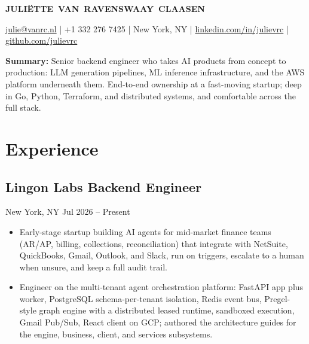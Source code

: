 \documentclass[9pt,letterpaper]{article}
\begin{document}
\begin{center}
    {\Large\bfseries JULIËTTE~VAN~RAVENSWAAY~CLAASEN}
\end{center}
\vspace{2pt}
\begin{center}
\href{mailto:julie@vanrc.nl}{julie@vanrc.nl} \;|\;
+1 332 276 7425 \;|\;
New York, NY \;|\;
\href{https://linkedin.com/in/julievrc}{linkedin.com/in/julievrc} \;|\;
\href{https://github.com/julievrc}{github.com/julievrc}
\end{center}
\vspace{0.05cm}
\textbf{Summary:} Senior backend engineer who takes AI products from concept to production: LLM generation pipelines, ML inference infrastructure, and the AWS platform underneath them. End-to-end ownership at a fast-moving startup; deep in Go, Python, Terraform, and distributed systems, and comfortable across the full stack.
\section{Experience}
\subsection{Lingon Labs \hfill Backend Engineer}
New York, NY \hfill Jul 2026 -- Present
\begin{itemize}
\item Early-stage startup building AI agents for mid-market finance teams (AR/AP, billing, collections, reconciliation) that integrate with NetSuite, QuickBooks, Gmail, Outlook, and Slack, run on triggers, escalate to a human when unsure, and keep a full audit trail.
\item Engineer on the multi-tenant agent orchestration platform: FastAPI app plus worker, PostgreSQL schema-per-tenant isolation, Redis event bus, Pregel-style graph engine with a distributed leased runtime, sandboxed execution, Gmail Pub/Sub, React client on GCP; authored the architecture guides for the engine, business, client, and services subsystems.
\end{itemize}
\end{document}
